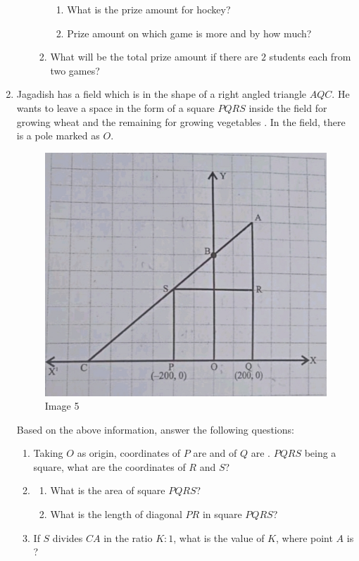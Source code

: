 \begin{enumerate}
\begin{enumerate}
\begin{enumerate}
\begin{enumerate}
\item
What is the prize amount for hockey?
\item
Prize amount on which game is more and by how much?
\end{enumerate}
\item
What will be the total prize amount if there are $2$ students each from two games?
\end{enumerate}
\end{enumerate}
\newpage
\item
Jagadish has a field which is in the shape of a right angled triangle $AQC$. He wants to leave a space in the form of a square $PQRS$ inside the field for growing wheat and the remaining for growing vegetables . In the field, there is a pole marked as $O$.
\begin{figure}[h!]
\centering
\includegraphics[width=\columnwidth]{figs/img5.jpg}
\caption{Image 5}
\end{figure}
Based on the above information, answer the following questions:
\begin{enumerate}
\item
Taking $O$ as origin, coordinates of $P$ are  and of $Q$ are . $PQRS$ being a square, what are the coordinates of $R$ and $S$?
\item
\begin{enumerate}
\item
What is the area of square $PQRS$?
\item
What is the length of diagonal $PR$ in square $PQRS$?
\end{enumerate}
\item
If $S$ divides $CA$ in the ratio $K:1$, what is the value of $K$, where point $A$ is ?
\end{enumerate}

\end{enumerate}

